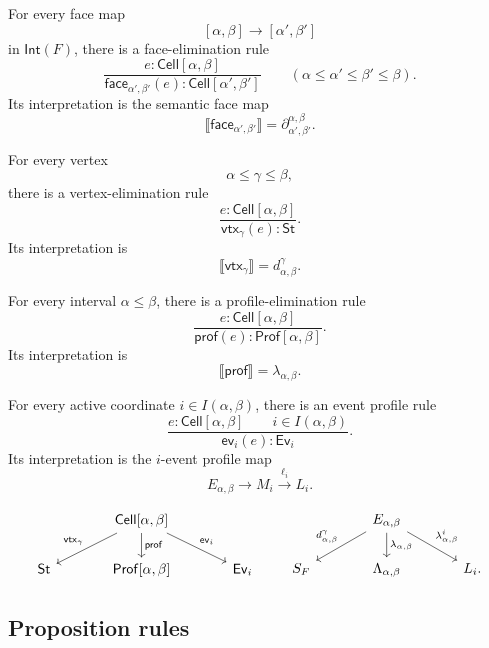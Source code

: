 For every face map
\[
    [\alpha,\beta]\to[\alpha',\beta']
\]
in \(\mathsf{Int}(F)\), there is a face-elimination rule
\[
\frac{
    e:\mathsf{Cell}[\alpha,\beta]
}{
    \mathsf{face}_{\alpha',\beta'}(e):
    \mathsf{Cell}[\alpha',\beta']
}
\qquad
(\alpha\leq\alpha'\leq\beta'\leq\beta).
\]
Its interpretation is the semantic face map
\[
    \llbracket \mathsf{face}_{\alpha',\beta'}\rrbracket
    =
    \partial_{\alpha',\beta'}^{\alpha,\beta}.
\]

For every vertex
\[
    \alpha\leq\gamma\leq\beta,
\]
there is a vertex-elimination rule
\[
\frac{
    e:\mathsf{Cell}[\alpha,\beta]
}{
    \mathsf{vtx}_{\gamma}(e):\mathsf{St}
}.
\]
Its interpretation is
\[
    \llbracket \mathsf{vtx}_{\gamma}\rrbracket
    =
    d_{\alpha,\beta}^{\gamma}.
\]

For every interval \(\alpha\leq\beta\), there is a profile-elimination rule
\[
\frac{
    e:\mathsf{Cell}[\alpha,\beta]
}{
    \mathsf{prof}(e):\mathsf{Prof}[\alpha,\beta]
}.
\]
Its interpretation is
\[
    \llbracket \mathsf{prof}\rrbracket
    =
    \lambda_{\alpha,\beta}.
\]

For every active coordinate \(i\in I(\alpha,\beta)\), there is an event
profile rule
\[
\frac{
    e:\mathsf{Cell}[\alpha,\beta]
    \qquad
    i\in I(\alpha,\beta)
}{
    \mathsf{ev}_i(e):\mathsf{Ev}_i
}.
\]
Its interpretation is the \(i\)-event profile map
\[
        E_{\alpha,\beta}
        \longrightarrow
        M_i
        \xrightarrow{\ell_i}
        L_i.
\]

\[
\begin{tikzcd}[column sep=large]
&
\mathsf{Cell}[\alpha,\beta]
    \arrow[dl,"\mathsf{vtx}_{\gamma}"']
    \arrow[d,"\mathsf{prof}"]
    \arrow[dr,"\mathsf{ev}_i"]
&
\\
\mathsf{St}
&
\mathsf{Prof}[\alpha,\beta]
&
\mathsf{Ev}_i
\end{tikzcd}
\qquad
\begin{tikzcd}[column sep=large]
&
E_{\alpha,\beta}
    \arrow[dl,"d_{\alpha,\beta}^{\gamma}"']
    \arrow[d,"\lambda_{\alpha,\beta}"]
    \arrow[dr,"\lambda_{\alpha,\beta}^{i}"]
&
\\
S_F
&
\Lambda_{\alpha,\beta}
&
L_i .
\end{tikzcd}
\]

\subsection{Proposition rules}
\label{subsec:cmett-proposition-rules}

